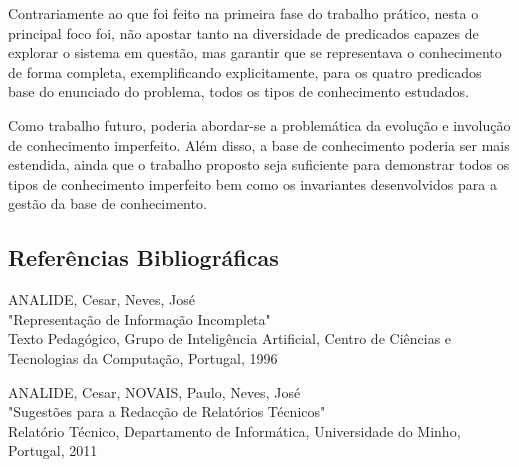 \documentclass[a4paper, 11pt]{article}
\begin{document}
Contrariamente ao que foi feito na primeira fase do trabalho prático, nesta o principal foco foi, 
não apostar tanto na diversidade de predicados capazes de explorar o sistema em questão, mas 
garantir que se representava o conhecimento de forma completa,
exemplificando explicitamente, para os quatro predicados base do enunciado do problema,
todos os tipos de conhecimento estudados.

Como trabalho futuro, poderia abordar-se a problemática da evolução e involução de 
conhecimento imperfeito. Além disso, a base de conhecimento poderia ser mais estendida, ainda que 
o trabalho proposto seja
suficiente para demonstrar todos os tipos de conhecimento imperfeito bem como os invariantes
desenvolvidos para a gestão da base de conhecimento.

\pagebreak



\pagebreak


\printnomenclature

\pagebreak

\begin{thebibliography}{2}

\section*{Referências Bibliográficas}

ANALIDE, Cesar, Neves, José\\ 
"Representação de Informação Incompleta"\\
Texto Pedagógico, Grupo de Inteligência Artificial, Centro de Ciências e Tecnologias da 
Computação, Portugal, 1996

ANALIDE, Cesar, NOVAIS, Paulo, Neves, José\\
"Sugestões para a Redacção de Relatórios Técnicos"\\
Relatório Técnico, Departamento de Informática, Universidade do Minho, Portugal, 2011

\end{thebibliography}
\end{document}
